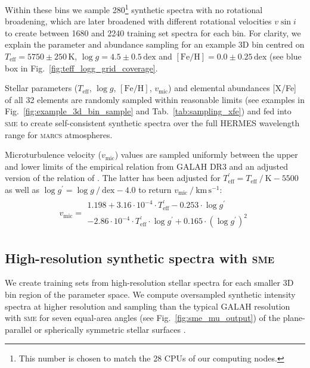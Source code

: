 \documentclass[
  journal=pasa,
  manuscript=research-paper, %
  year=2024,
  volume=37
]{cup-journal}
\newcommand{\Teff}{$T_\mathrm{eff}$\xspace}
\newcommand{\logg}{$\log g$\xspace}
\newcommand{\feh}{$\mathrm{[Fe/H]}$\xspace}
\newcommand{\vmic}{$v_\mathrm{mic}$\xspace}
\newcommand{\vsini}{$v \sin i$\xspace}
\newcommand{\sme}{\textsc{sme}\xspace}
\newcommand{\marcs}{\textsc{marcs}\xspace}
\newcommand{\dex}{\,\mathrm{dex}}	%
\newcommand{\K}{\,\mathrm{K}}	%
\begin{document}
Within these bins we sample 280\footnote{This number is chosen to match the 28 CPUs of our computing nodes.} synthetic spectra with no rotational broadening, which are later broadened with different rotational velocities \vsini to create between 1680 and 2240 training set spectra for each bin. For clarity, we explain the parameter and abundance sampling for an example 3D bin centred on $T_\text{eff} = 5750\pm250\K$, $\log g = 4.5\pm0.5\dex$ and $\mathrm{[Fe/H]} = 0.0\pm0.25\dex$ (see blue box in Fig.~\ref{fig:teff_logg_grid_coverage}.

Stellar parameters (\Teff, \logg, \feh, \vmic) and elemental abundances [X/Fe] of all 32 elements are randomly sampled within reasonable limits (see examples in Fig.~\ref{fig:example_3d_bin_sample} and Tab.~\ref{tab:sampling_xfe}) and fed into \sme to create self-consistent synthetic spectra over the full HERMES wavelength range for \marcs atmospheres. 

Microturbulence velocity (\vmic) values are sampled uniformly between the upper and lower limits of the empirical relation from GALAH DR3 \citep[Eqs.~4 and 5 from][]{Buder2021} and an adjusted version of the relation of \citet{DutraFerreira2016}. The latter has been adjusted for $T_\text{eff}^\prime = T_\text{eff}~/~\mathrm{K} - 5500$ as well as $\log g^\prime = \log g~/~\mathrm{dex} - 4.0$ to return $v_\text{mic}~/~\mathrm{km\,s^{-1}}$:
\begin{align} 
v_\text{mic} = \begin{array}{l}
1.198 + 3.16 \cdot 10^{-4} \cdot T_\text{eff}^\prime - 0.253 \cdot \log g^\prime \\ - 2.86\cdot 10^{-4} \cdot T_\text{eff}^\prime \cdot \log g^\prime + 0.165 \cdot (\log g^\prime)^2
\end{array} \label{eq:vmic_initial}
\end{align}

\subsection{High-resolution synthetic spectra with \sme}
\label{sec:higher_resolution_synthetic_spectra}

We create training sets from high-resolution stellar spectra for each smaller 3D bin region of the parameter space. We compute oversampled synthetic intensity spectra at higher resolution and sampling than the typical GALAH resolution with \sme for seven equal-area angles (see Fig.~\ref{fig:sme_mu_output}) of the plane-parallel or spherically symmetric stellar surfaces \citep{Gustafsson2008}.
\end{document}
